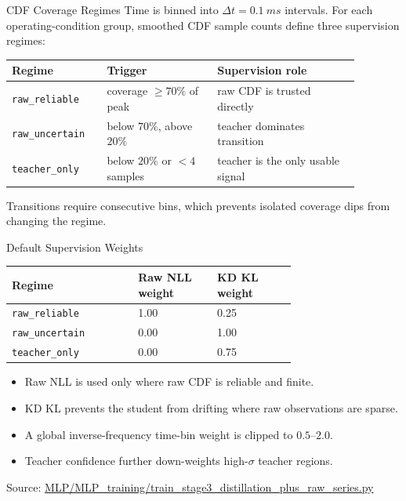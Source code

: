\documentclass[UTF8,aspectratio=169]{ctexbeamer}
\newcommand{\src}[1]{\vfill{\tiny\textcolor{gray!75!black}{Source: \url{#1}}}}
\begin{document}
\begin{frame}{CDF Coverage Regimes}
\small
Time is binned into \(\Delta t=\SI{0.1}{ms}\) intervals. For each operating-condition group, smoothed CDF sample counts define three supervision regimes:

\vspace{0.4em}
\begin{tabular}{L{0.24\linewidth}L{0.28\linewidth}L{0.36\linewidth}}
\toprule
Regime & Trigger & Supervision role \\
\midrule
\texttt{raw\_reliable} & coverage \(\geq70\%\) of peak & raw CDF is trusted directly \\
\texttt{raw\_uncertain} & below \(70\%\), above \(20\%\) & teacher dominates transition \\
\texttt{teacher\_only} & below \(20\%\) or \(<4\) samples & teacher is the only usable signal \\
\bottomrule
\end{tabular}

\vspace{0.5em}
Transitions require consecutive bins, which prevents isolated coverage dips from changing the regime.
\end{frame}

\begin{frame}{Default Supervision Weights}
\small
\begin{center}
\begin{tabular}{L{0.32\linewidth}R{0.20\linewidth}R{0.20\linewidth}}
\toprule
Regime & Raw NLL weight & KD KL weight \\
\midrule
\texttt{raw\_reliable} & 1.00 & 0.25 \\
\texttt{raw\_uncertain} & 0.00 & 1.00 \\
\texttt{teacher\_only} & 0.00 & 0.75 \\
\bottomrule
\end{tabular}
\end{center}

\vspace{0.45em}
\begin{itemize}
  \item Raw NLL is used only where raw CDF is reliable and finite.
  \item KD KL prevents the student from drifting where raw observations are sparse.
  \item A global inverse-frequency time-bin weight is clipped to \(0.5\)--\(2.0\).
  \item Teacher confidence further down-weights high-\(\sigma\) teacher regions.
\end{itemize}

\src{MLP/MLP_training/train_stage3_distillation_plus_raw_series.py}
\end{frame}
\end{document}
